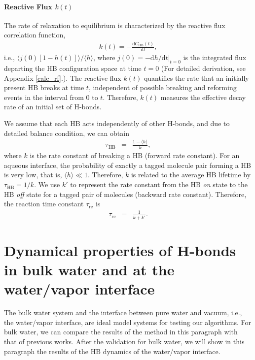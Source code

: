 \FloatBarrier
\paragraph{Reactive Flux $k(t)$} 
The rate of relaxation to equilibrium is characterized by the reactive flux correlation function, 
\begin{eqnarray}
k(t) = -\frac{\text{d}C_{\text{HB}}(t)}{\text{d}t},
\label{eq:k}
\end{eqnarray}
i.e., $\langle j(0)[1-h(t)]\rangle/\langle h\rangle$,
where 
$j(0)=-\text{d}h/\text{d}t|_{t=0}$ 
is the integrated flux departing the HB configuration space at time $t=0$ (For detailed derivation, see Appendix \ref{calc_rf}.).
The reactive flux $k(t)$ quantifies the rate that an initially present HB breaks at time $t$, 
independent of possible breaking and reforming events in the interval from 0 to $t$.
Therefore, $k(t)$ measures the effective decay rate of an 
initial set of H-bonds. \cite{DC87,FWS00}


We assume that each HB acts independently of other H-bonds, \cite{AL96,AL00} 
and due to detailed balance condition, we can obtain 
\begin{eqnarray}
  \tau_{\text{HB}} &=& \frac{1- \langle h\rangle}{k},
\label{eq:rate}
\end{eqnarray}
where $k$ is the rate constant of breaking a HB (forward rate constant). \cite{Chandler1986,Chandler1978} 
For an aqueous interface, the probability of exactly a tagged molecule pair forming a HB is very low, that is, $\langle h\rangle \ll 1$. 
Therefore, $k$ is related to the average HB lifetime by $\tau_{\text{HB}}=1/k$.
We use $k'$ to represent the rate constant from the HB \emph{on} state to the HB \emph{off} state for a tagged pair of molecules (backward rate constant).
Therefore, the reaction time constant $\tau_\text{re}$ is 
\begin{eqnarray}
  \tau_\text{re} &=& \frac{1}{k+k'}.
\label{eq:reaction_rate_tau}
\end{eqnarray}

%
\FloatBarrier
\section{Dynamical properties of H-bonds in bulk water and at the water/vapor interface}
The bulk water system and the interface between pure water and vacuum, i.e., the water/vapor interface, 
are ideal model systems for testing our algorithms.
For bulk water, we can compare the results of the method in this paragraph with that of 
previous works.\cite{AL96,Kessler2015} After the validation for bulk water, we will show in this paragraph the results of the HB dynamics of the water/vapor interface.

